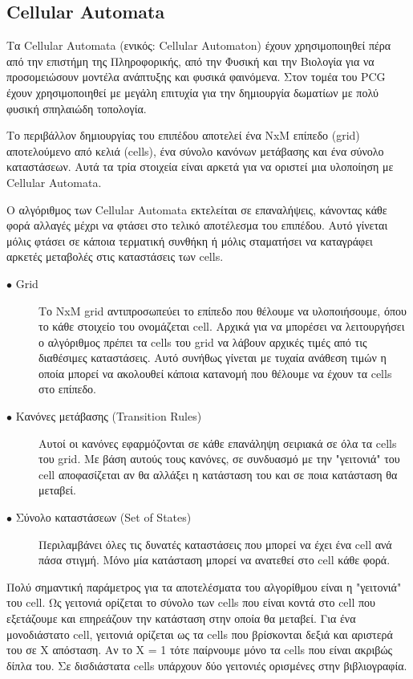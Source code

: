 \subsection{Cellular Automata}
Τα Cellular Automata (ενικός: Cellular Automaton) \cite{cellular} έχουν χρησιμοποιηθεί πέρα από την επιστήμη της Πληροφορικής, από την Φυσική και την Βιολογία για να προσομειώσουν μοντέλα ανάπτυξης και φυσικά φαινόμενα. Στον τομέα του PCG έχουν χρησιμοποιηθεί με μεγάλη επιτυχία για την δημιουργία δωματίων με πολύ φυσική σπηλαιώδη τοπολογία.
\par
Το περιβάλλον δημιουργίας του επιπέδου αποτελεί ένα NxM επίπεδο (grid) αποτελούμενο από κελιά (cells), ένα σύνολο κανόνων μετάβασης και ένα σύνολο καταστάσεων. Αυτά τα τρία στοιχεία είναι αρκετά για να οριστεί μια υλοποίηση με Cellular Automata. 
\par
 Ο αλγόριθμος των Cellular Automata εκτελείται σε επαναλήψεις, κάνοντας κάθε φορά αλλαγές μέχρι να φτάσει στο τελικό αποτέλεσμα του επιπέδου. Αυτό γίνεται μόλις φτάσει σε κάποια τερματική συνθήκη ή μόλις σταματήσει να καταγράφει αρκετές μεταβολές στις καταστάσεις των cells.
\begin{description}
  \item[$\bullet$ Grid] Το NxM grid αντιπροσωπεύει το επίπεδο που θέλουμε να υλοποιήσουμε, όπου το κάθε στοιχείο του ονομάζεται cell. Αρχικά για να μπορέσει να λειτουργήσει ο αλγόριθμος πρέπει τα cells του grid να λάβουν αρχικές τιμές από τις διαθέσιμες καταστάσεις. Αυτό συνήθως γίνεται με τυχαία ανάθεση τιμών η οποία μπορεί να ακολουθεί κάποια κατανομή που θέλουμε να έχουν τα cells στο επίπεδο.
  \item[$\bullet$ Κανόνες μετάβασης (Transition Rules)] Αυτοί οι κανόνες εφαρμόζονται σε κάθε επανάληψη σειριακά σε όλα τα cells του grid. Με βάση αυτούς τους κανόνες, σε συνδυασμό με την "γειτονιά" του cell αποφασίζεται αν θα αλλάξει η κατάσταση του και σε ποια κατάσταση θα μεταβεί.
    \item[$\bullet$ Σύνολο καταστάσεων (Set of States)] Περιλαμβάνει όλες τις δυνατές καταστάσεις που μπορεί να έχει ένα cell ανά πάσα στιγμή. Μόνο μία κατάσταση μπορεί να ανατεθεί στο cell κάθε φορά.
\end{description}
\par
Πολύ σημαντική παράμετρος για τα αποτελέσματα του αλγορίθμου είναι η "γειτονιά" του cell. Ως γειτονιά ορίζεται το σύνολο των cells που είναι κοντά στο cell που εξετάζουμε και επηρεάζουν την κατάσταση στην οποία θα μεταβεί. Για ένα μονοδιάστατο cell, γειτονιά ορίζεται ως τα cells που βρίσκονται δεξιά και αριστερά του σε X απόσταση. Αν το X = 1 τότε παίρνουμε μόνο τα cells που είναι ακριβώς δίπλα του. Σε δισδιάστατα cells υπάρχουν δύο γειτονιές ορισμένες στην βιβλιογραφία.

